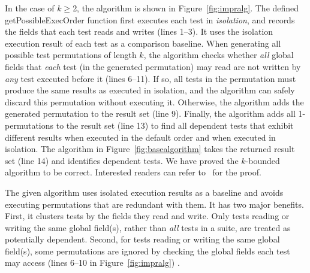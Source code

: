 In the case of $k$$\ge$2, the algorithm
is shown in Figure~\ref{fig:impralg}.
%
The defined getPossibleExecOrder function first executes
each test in \textit{isolation}, and records the
fields that each test reads and writes (lines 1--3).
It uses the isolation execution result
of each test as a comparison baseline.
When generating all possible test permutations
of length $k$, the algorithm checks whether
\textit{all} global fields that \textit{each} test (in the generated permutation)
may read are not written by \textit{any} test executed before it (lines 6--11).
If so, all tests in the permutation
must produce the same results as executed in isolation,
and the algorithm can safely discard this permutation without
executing it. Otherwise, the algorithm adds the generated
permutation to the result set (line 9).
Finally, the algorithm adds all 1-permutations to
the result set (line 13)
to find all dependent tests that exhibit different results
when executed in the default order and when executed in isolation.
The algorithm in Figure~\ref{fig:basealgorithm} takes the
returned result set (line 14) and identifies dependent tests. %
%
We have proved the \dependenceaware{} $k$-bounded algorithm to be
correct. Interested
readers can refer to~\cite{testdependence} for the proof.

The given algorithm uses isolated execution results as a baseline and
avoids executing permutations that are redundant with them.
%
It has two major benefits.
First, it clusters tests by the fields they
read and write. Only tests reading or writing
the same global field(s), rather than \textit{all} tests
in a suite, are treated as potentially dependent.
Second, for tests reading or writing the same global
field(s), some permutations are ignored by checking
the global fields each test may access (lines 6--10 in
Figure~\ref{fig:impralg}) . 



